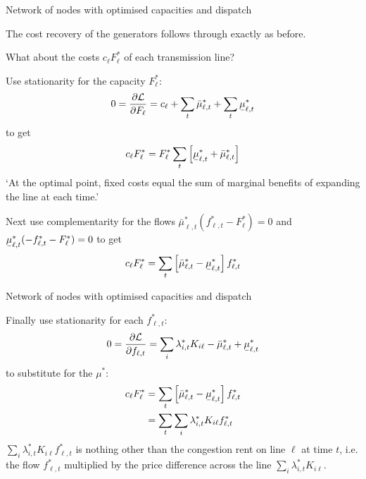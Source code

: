 \documentclass[10pt,dvipsnames]{beamer}
\def\l{\lambda}
\def\m{\mu}
\def\d{\partial}
\def\cL{\mathcal{L}}
\newcommand{\ubar}[1]{\text{\b{$#1$}}}
\begin{document}
\begin{frame}{Network of nodes with optimised capacities and dispatch}

  The cost recovery of the generators follows through exactly as before.

  What about the costs $c_\ell F_\ell^*$ of each transmission line?


  Use stationarity for the capacity $F_{\ell}^*$:
    \begin{align*}
        0 = \frac{\d \cL}{\d F_{\ell}}  = c_\ell   +\sum_t \bar{\m}^*_{\ell,t}  + \sum_t \ubar{\m}^*_{\ell,t}
    \end{align*}
    to get
    \begin{align*}
      c_\ell F_\ell^* = F_\ell^* \sum_t \left[ \ubar{\m}^*_{\ell,t} +  \bar{\m}^*_{\ell,t} \right]
    \end{align*}
   `At the optimal point, fixed costs equal the sum of marginal
    benefits of expanding the line at each time.'


  Next use complementarity for the flows $\bar{\m}_{\ell,t}^* ( f_{\ell,t}^* - F_\ell^*) = 0$ and $\ubar{\m}_{\ell,t}^* ( - f_{\ell,t}^* - F_\ell^*) = 0$ to get
    \begin{align*}
      c_\ell F_\ell^* =  \sum_t \left[ \bar{\m}^*_{\ell,t} -  \ubar{\m}^*_{\ell,t} \right] f_{\ell,t}^*
    \end{align*}

\end{frame}


\begin{frame}{Network of nodes with optimised capacities and dispatch}

  Finally use stationarity for each $f_{\ell,t}^*$:
    \begin{align*}
        0 = \frac{\d \cL}{\d f_{\ell,t}}  = \sum_i \l_{i,t}^*K_{i\ell}  - \bar{\m}^*_{\ell,t} + \ubar{\m}^*_{\ell,t}
  \end{align*}
    to substitute for the $\m^*$:
    \begin{align*}
      c_\ell F_\ell^*  &=  \sum_t \left[ \bar{\m}^*_{\ell,t} -  \ubar{\m}^*_{\ell,t}   \right] f_{\ell,t}^* \\
      & =\sum_t \sum_i \l_{i,t}^*K_{i\ell} f_{\ell,t}^*
    \end{align*}
    $ \sum_i \l_{i,t}^*K_{i\ell} f_{\ell,t}^*$ is nothing other than
    the \alert{congestion rent} on line $\ell$ at time $t$, i.e. the flow $f_{\ell,t}^*$ multiplied by the price difference across the line $\sum_i \l_{i,t}^*K_{i\ell}$.

\end{frame}
\end{document}
